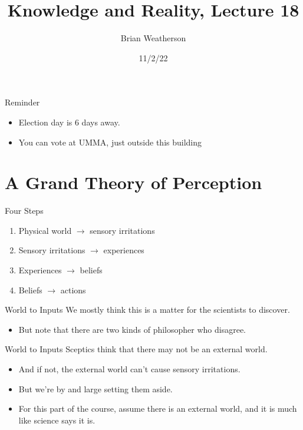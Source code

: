 \documentclass[
  17pt,
  letterpaper,
  ignorenonframetext,
  aspectratio=169,
]{beamer}
\title{Knowledge and Reality, Lecture 18}
\author{Brian Weatherson}
\date{11/2/22}
\providecommand{\tightlist}{%
  \setlength{\itemsep}{0pt}\setlength{\parskip}{0pt}}\usepackage{longtable,booktabs,array}
\begin{document}
\frame{\titlepage}
\ifdefined\Shaded\renewenvironment{Shaded}{\begin{tcolorbox}[boxrule=0pt, enhanced, borderline west={3pt}{0pt}{shadecolor}, breakable, sharp corners, interior hidden, frame hidden]}{\end{tcolorbox}}\fi

\begin{frame}{Reminder}
\protect\hypertarget{reminder}{}
\begin{itemize}[<+->]
\tightlist
\item
  Election day is 6 days away.
\item
  You can vote at UMMA, just outside this building
\end{itemize}
\end{frame}

\hypertarget{a-grand-theory-of-perception}{%
\section{A Grand Theory of
Perception}\label{a-grand-theory-of-perception}}

\begin{frame}{Four Steps}
\protect\hypertarget{four-steps}{}
\begin{enumerate}[<+->]
\tightlist
\item
  Physical world \(\rightarrow\) sensory irritations
\item
  Sensory irritations \(\rightarrow\) experiences
\item
  Experiences \(\rightarrow\) beliefs
\item
  Beliefs \(\rightarrow\) actions
\end{enumerate}
\end{frame}

\begin{frame}{World to Inputs}
\protect\hypertarget{world-to-inputs}{}
We mostly think this is a matter for the scientists to discover.

\begin{itemize}[<+->]
\tightlist
\item
  But note that there are two kinds of philosopher who disagree.
\end{itemize}
\end{frame}

\begin{frame}{World to Inputs}
\protect\hypertarget{world-to-inputs-1}{}
Sceptics think that there may not be an external world.

\begin{itemize}[<+->]
\tightlist
\item
  And if not, the external world can't cause sensory irritations.
\item
  But we're by and large setting them aside.
\item
  For this part of the course, assume there is an external world, and it
  is much like science says it is.
\end{itemize}
\end{frame}
\end{document}
